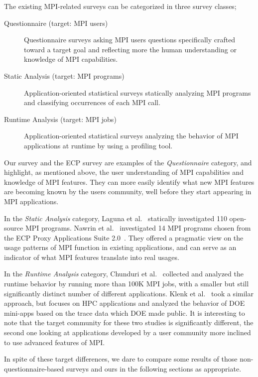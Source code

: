 \documentclass[preprint,5p,times]{elsarticle}
\begin{document}
{
The existing MPI-related surveys can be categorized in three survey classes;
%
\begin{description}
\item[Questionnaire (target: MPI users)] Questionnaire surveys asking MPI
  users questions specifically crafted toward a target goal and
  reflecting more the human understanding or knowledge of MPI
  capabilities.
  \item[Static Analysis (target: MPI programs)] Application-oriented statistical surveys
    statically analyzing MPI programs and classifying occurrences of
    each MPI call.
  \item[Runtime Analysis (target: MPI jobs)] Application-oriented statistical surveys
    analyzing the behavior of MPI applications at runtime by using a
    profiling tool.
\end{description}

Our survey and the ECP survey are examples of the {\it Questionnaire} category,
and highlight, as mentioned above, the user understanding of MPI
capabilities and knowledge of MPI features. They can more easily
identify what new MPI features are becoming known by the users
community, well before they start appearing in MPI applications.

In the {\it Static Analysis} category, Laguna et
al.~\cite{10.1145/3295500.3356176} statically investigated
110 open-source MPI programs. Nawrin et al.~\cite{cpe-5901}
investigated 14 MPI programs chosen from the ECP Proxy Applications Suite
2.0~\cite{osti-1482870}. They offered a pragmatic view on the usage patterns of
MPI function in existing applications, and can serve as an indicator of what MPI
features translate into real usages.

In the {\it Runtime Analysis} category, Chunduri et al.~\cite{8665758}
collected and analyzed the runtime behavior by running more than 100K
MPI jobs, with a smaller but still significantly distinct number of
different applications. Klenk et
al.~\cite{10.1007/978-3-319-58667-0-12} took a similar approach, but
focuses on HPC applications and analyzed the behavior of DOE
mini-apps based on the trace data which DOE made public. It is
interesting to note that the target community for these
two studies is significantly different, the second one
looking at applications developed by a user community more inclined to
use advanced features of MPI.

In spite of these target differences, we dare to compare some results
of those non-questionnaire-based surveys and ours in the
following sections as appropriate.}
\end{document}
